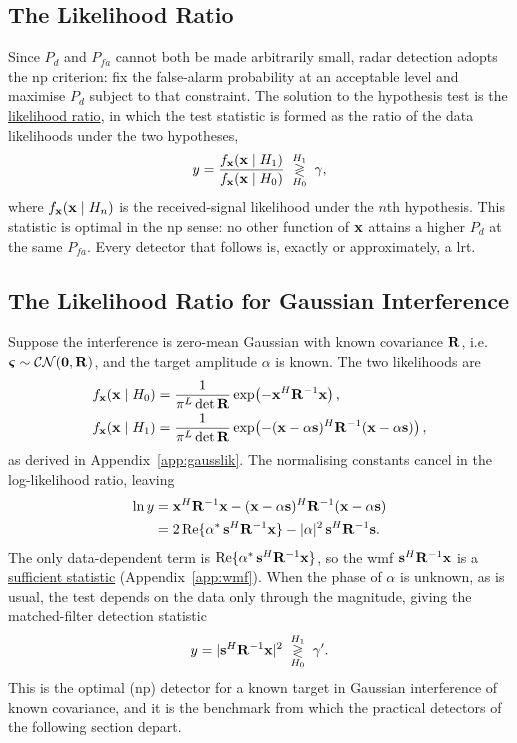 \documentclass{article}
\begin{document}
\subsection{The Likelihood Ratio}
Since $P_d$ and $P_{fa}$ cannot both be made arbitrarily small, radar detection adopts the \gls{np} criterion: fix the false-alarm probability at an acceptable level and maximise $P_d$ subject to that constraint. The solution to the hypothesis test is the \underline{likelihood ratio}, in which the test statistic is formed as the ratio of the data likelihoods under the two hypotheses,
$$y = \frac{f_{\vb x}(\vb x\mid H_1)}{f_{\vb x}(\vb x\mid H_0)}
   \;\underset{H_0}{\overset{H_1}{\gtrless}}\;\gamma,$$
where $f_{\vb x}(\vb x\mid H_n)$ is the received-signal likelihood under the $n$th hypothesis. This statistic is optimal in the \gls{np} sense: no other function of $\vb x$ attains a higher $P_d$ at the same $P_{fa}$. Every detector that follows is, exactly or approximately, a \gls{lrt}.

\subsection{The Likelihood Ratio for Gaussian Interference}
\label{2.4}
Suppose the interference is zero-mean Gaussian with known covariance $\vb R$, i.e.\ $\boldsymbol{\varsigma}\sim\mathcal{CN}(\vb 0,\vb R)$, and the target amplitude $\alpha$ is known. The two likelihoods are
\begin{align}
    f_{\vb x}(\vb x\mid H_0) &= \frac{1}{\pi^L\det\vb R}
        \exp\!\left(-\vb x^H\vb R^{-1}\vb x\right), \nonumber\\
    f_{\vb x}(\vb x\mid H_1) &= \frac{1}{\pi^L\det\vb R}
        \exp\!\left(-(\vb x-\alpha\vb s)^H\vb R^{-1}(\vb x-\alpha\vb s)\right), \nonumber
\end{align}
as derived in Appendix~\ref{app:gausslik}. The normalising constants cancel in the log-likelihood  ratio, leaving
\begin{align}
    \ln y
    &= \vb x^H\vb R^{-1}\vb x - (\vb x-\alpha\vb s)^H\vb R^{-1}(\vb x-\alpha\vb s)
       \nonumber\\
    &= 2\,\mathrm{Re}\{\alpha^*\,\vb s^H\vb R^{-1}\vb x\}
       - |\alpha|^2\,\vb s^H\vb R^{-1}\vb s. \nonumber
\end{align}
The only data-dependent term is $\mathrm{Re}\{\alpha^*\,\vb s^H\vb R^{-1}\vb x\}$, so the \gls{wmf} $\vb s^H\vb R^{-1}\vb x$ is a \underline{sufficient statistic} (Appendix~\ref{app:wmf}). When the phase of $\alpha$ is unknown, as is usual, the test depends on the data only through the magnitude, giving the matched-filter detection statistic
$$y = |\vb s^H\vb R^{-1}\vb x|^2
   \;\underset{H_0}{\overset{H_1}{\gtrless}}\;\gamma'.$$
This is the optimal (\gls{np}) detector for a known target in Gaussian interference of known covariance, and it is the benchmark from which the practical detectors of the following section depart.
\end{document}

